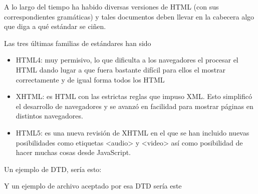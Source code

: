 \documentclass[letterpaper,10pt,spanish]{sphinxmanual}
\begin{document}
A lo largo del tiempo ha habido diversas versiones de HTML (con sus correspondientes gramáticas)
y tales documentos deben llevar en la cabecera algo que diga a qué estándar se ciñen.

Las tres últimas familias de estándares han sido
\begin{itemize}
\item {} 
HTML4: muy permisivo, lo que dificulta a los navegadores el procesar el HTML dando lugar a que fuera bastante difícil para ellos el mostrar correctamente y de igual forma todos los HTML

\item {} 
XHTML: es HTML con las estrictas reglas que impuso XML. Esto simplificó el desarrollo de navegadores y se avanzó en facilidad para mostrar páginas en distintos navegadores.

\item {} 
HTML5: es una nueva revisión de XHTML en el que se han incluido nuevas posibilidades como etiquetas \textless{}audio\textgreater{} y \textless{}video\textgreater{} así como posibilidad de hacer muchas cosas desde JavaScript.

\end{itemize}

Un ejemplo de DTD, sería esto:

\begin{sphinxVerbatim}[commandchars=\\\{\}]
  
     
   
   
   
  
\end{sphinxVerbatim}

Y un ejemplo de archivo aceptado por esa DTD sería este
\end{document}
